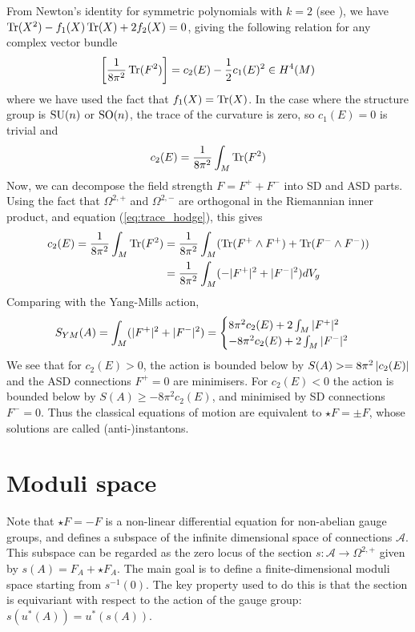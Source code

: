 From Newton's identity for symmetric polynomials with $k=2$ 
(see \cite[Theorem B.2]{loringtu}), we have $\operatorname{Tr}(X^2)-f_1(X)\operatorname{Tr}(X)+2f_2(X)=0$, 
giving the following relation for any complex vector bundle
\[ %
	\bracket{\frac{1}{8\pi^2} \Tr(F^2)} = c_2(E) - \frac{1}{2}c_1(E)^2 \in H^4(M)
\] 
where we have used the fact that $f_1(X)=\operatorname{Tr}(X)$. 
In the case where the structure group is $\operatorname{SU}(n)$ or $\operatorname{SO}(n)$, the trace of the
curvature is zero, so $c_1(E)=0$ is trivial and 
\[
c_2(E) = \frac{1}{8\pi^2}\int_M \operatorname{Tr}(F^2)
\] 
Now, we can
decompose the field strength $F = F^+ + F^-$ into SD and ASD 
parts. Using the fact that $\Omega^{2,+}$ and $\Omega^{2,-}$ are orthogonal in
the Riemannian inner product, and
equation (\ref{eq:trace_hodge}), this gives 
\begin{align*}
c_2(E)
= \frac{1}{8\pi^2}\int_M\Tr(F^2) 
&= \frac{1}{8\pi^2}\int_M(\Tr(F^{+}\wedge  F^{+}) + \Tr(F^{-}\wedge F^{-})) \\
&= \frac{1}{8\pi^2}\int_M(-\abs[*]{F^+}^2 + \abs[*]{F^-}^2) dV_g 
\end{align*}
Comparing with the Yang-Mills action, 
\begin{align*}
	S_{YM}(A) = \int_M (\abs[*]{F^+}^2+\abs[*]{F^-}^2) 
	= \begin{cases}
		8\pi^2 c_2(E) + 2\int_M \abs[*]{F^+}^2 \\
		-8\pi^2 c_2(E) + 2\int_M \abs[*]{F^-}^2
	\end{cases}
\end{align*}
We see that for $c_2(E)>0$, the action is bounded below by 
$S(A) >= 8\pi^2\abs{c_2(E)}$ and the ASD connections $F^+=0$ are
minimisers. For $c_2(E)<0$ the action is bounded
below by $S(A)\geq -8\pi^2c_2(E)$, and minimised by SD connections
$F^-=0$. 
Thus the classical equations of motion are equivalent to $\star F = \pm F$,
whose solutions are called (anti-)instantons. 

\section{Moduli space}
Note that $\star F = - F$ is a non-linear differential equation for
non-abelian gauge groups, and defines a subspace of the infinite dimensional
space of connections $\mathcal{A}$. This subspace can be regarded as the zero
locus of the section $s : \mathcal{A} \to \Omega^{2,+}$ given by $s(A) =
F_A+\star F_A$. The main goal is to define a finite-dimensional moduli space
starting from  $s^{-1}(0)$. 
The key property used to do this is that the section is equivariant with respect
to the action of the gauge group: $s(u^*(A))=u^*(s(A))$.

